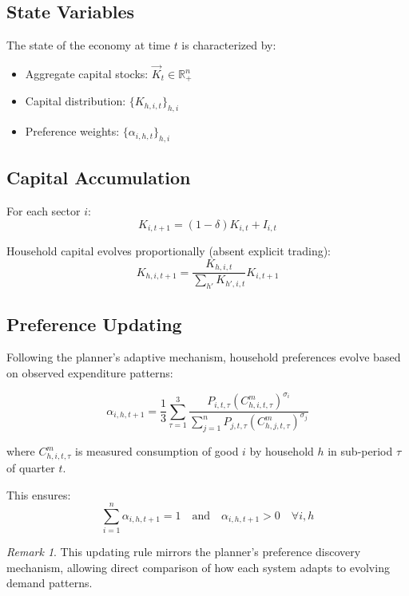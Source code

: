 \documentclass[12pt,a4paper]{article}
\theoremstyle{definition}
\theoremstyle{remark}
\newtheorem{remark}[theorem]{Remark}
\newcommand{\R}{\mathbb{R}}
\begin{document}
\subsection{State Variables}

The state of the economy at time $t$ is characterized by:
\begin{itemize}
    \item Aggregate capital stocks: $\vec{K}_t \in \R^n_+$
    \item Capital distribution: $\{K_{h,i,t}\}_{h,i}$
    \item Preference weights: $\{\alpha_{i,h,t}\}_{h,i}$
\end{itemize}

\subsection{Capital Accumulation}

For each sector $i$:
\begin{equation}
    K_{i,t+1} = (1-\delta)K_{i,t} + I_{i,t}
\end{equation}

Household capital evolves proportionally (absent explicit trading):
\begin{equation}
    K_{h,i,t+1} = \frac{K_{h,i,t}}{\sum_{h'} K_{h',i,t}} K_{i,t+1}
\end{equation}

\subsection{Preference Updating}

Following the planner's adaptive mechanism, household preferences evolve based on observed expenditure patterns:

\begin{equation}
    \alpha_{i,h,t+1} = \frac{1}{3} \sum_{\tau=1}^3 \frac{P_{i,t,\tau} (C_{h,i,t,\tau}^m)^{\sigma_i}}{\sum_{j=1}^n P_{j,t,\tau} (C_{h,j,t,\tau}^m)^{\sigma_j}}
\end{equation}

where $C_{h,i,t,\tau}^m$ is measured consumption of good $i$ by household $h$ in sub-period $\tau$ of quarter $t$.

This ensures:
\begin{equation}
    \sum_{i=1}^n \alpha_{i,h,t+1} = 1 \quad \text{and} \quad \alpha_{i,h,t+1} > 0 \quad \forall i,h
\end{equation}

\begin{remark}
This updating rule mirrors the planner's preference discovery mechanism, allowing direct comparison of how each system adapts to evolving demand patterns.
\end{remark}
\end{document}
